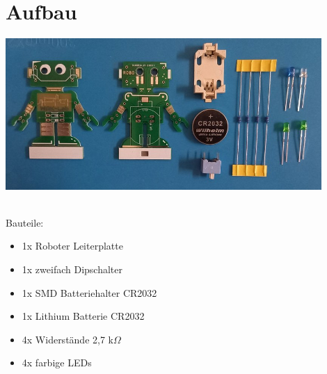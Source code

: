 \documentclass[a4paper]{article}
\begin{document}
\section{Aufbau}
\begin{minipage}[t]{\textwidth}
  \centering
  \includegraphics[width=0.9\textwidth]{../pictures/Parts.jpg}
  \label{img:Bauteile}
\end{minipage}
\ \\
Bauteile:
\begin{itemize}
\item 1x Roboter Leiterplatte
\item 1x zweifach Dipschalter
\item 1x SMD Batteriehalter CR2032
\item 1x Lithium Batterie CR2032
\item 4x Widerstände 2,7 k$\Omega$ 
\item 4x farbige LEDs
\end{itemize}
\end{document}
